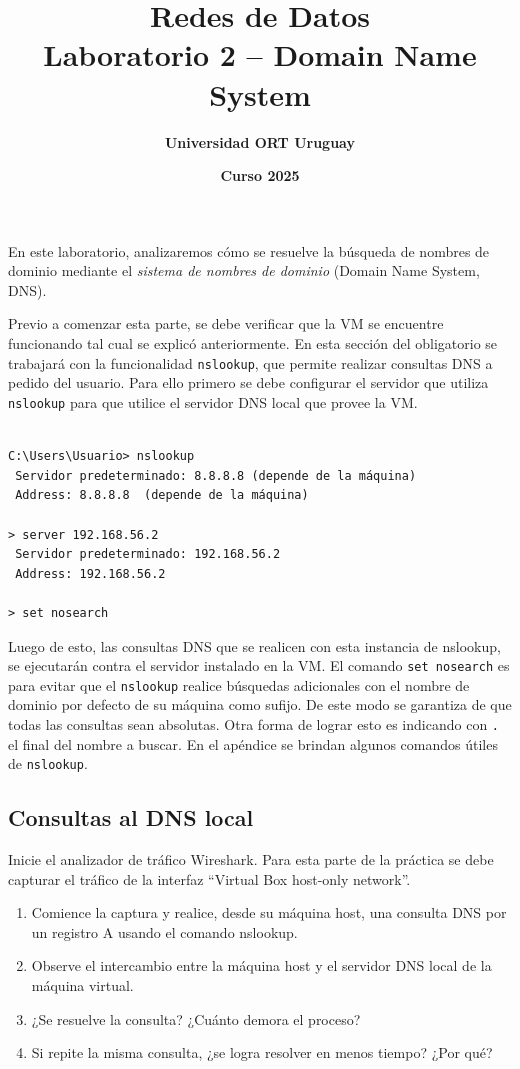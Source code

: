 \documentclass[a4paper,10pt]{article}
\title{\bf Redes de Datos\\Laboratorio 2 -- Domain Name System}
\author{\bf Universidad ORT Uruguay}
\date{\bf Curso 2025}
\begin{document}
\maketitle
\thispagestyle{fancy}

En este laboratorio, analizaremos cómo se resuelve la búsqueda de nombres de dominio mediante el \emph{sistema de nombres de dominio} (Domain Name System, DNS).

Previo a comenzar esta parte, se debe verificar que la VM se encuentre funcionando tal cual se explicó anteriormente. En esta sección del obligatorio se trabajará con la funcionalidad \texttt{nslookup}, que permite realizar consultas DNS a pedido del usuario. Para ello primero se debe configurar el servidor que utiliza \texttt{nslookup} para que utilice el servidor DNS local que provee la VM.

\begin{verbatim}

C:\Users\Usuario> nslookup
 Servidor predeterminado: 8.8.8.8 (depende de la máquina)
 Address: 8.8.8.8  (depende de la máquina)

> server 192.168.56.2
 Servidor predeterminado: 192.168.56.2
 Address: 192.168.56.2

> set nosearch
\end{verbatim}

Luego de esto, las consultas DNS que se realicen con esta instancia de nslookup, se ejecutarán contra el servidor instalado en la VM. El comando \texttt{set nosearch} es para evitar que el \texttt{nslookup} realice búsquedas adicionales con el nombre de dominio por defecto de su máquina como sufijo. De este modo se garantiza de que todas las consultas sean absolutas. Otra forma de lograr esto es indicando con \texttt{.} el final del nombre a buscar. En el apéndice se brindan algunos comandos útiles de \texttt{nslookup}.

\subsection*{Consultas al DNS local}

Inicie el analizador de tráfico Wireshark. Para esta parte de la práctica se debe capturar el tráfico de la interfaz ``Virtual Box host-only network''.

\begin{enumerate}
    \item Comience la captura y realice, desde su máquina host, una consulta DNS por un registro A usando el comando nslookup.
    \item Observe el intercambio entre la máquina host y el servidor DNS local de la máquina virtual.
    \item ¿Se resuelve la consulta? ¿Cuánto demora el proceso?
    \item Si repite la misma consulta, ¿se logra resolver en menos tiempo? ¿Por qué?
\end{enumerate}
\end{document}
